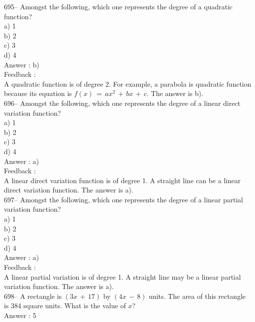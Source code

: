 \documentclass[letterpaper, 12pt]{article}
\begin{document}
695-- Amongst the following, which one represents the degree of a quadratic function?\\
a) 1\\
b) 2\\
c) 3\\
d) 4\\

Answer : b)\\

Feedback : \\
A quadratic function is of degree 2. For example, a parabola is quadratic function because its equation is 
$f(x)\,=\,ax^2 \,+\, bx \,+\, c$.  The answer is b).\\

696-- Amongst the following, which one represents the degree of a linear direct variation function?\\
a) 1\\
b) 2\\
c) 3\\
d) 4\\

Answer : a)\\

Feedback : \\
A linear direct variation function is of degree 1. A straight line can be a linear direct variation function. The answer is
a).\\

697-- Amongst the following, which one represents the degree of a linear partial variation function?\\
a) 1\\
b) 2\\
c) 3\\
d) 4\\

Answer : a)\\

Feedback : \\
A linear partial variation is of degree 1. A straight line may be a linear partial variation function. The answer is a).\\

698-- A rectangle is $(3x\,+\,17)$ by $(4x\,-\,8)$ units. The area of this rectangle is 384 square units. What is the value of $x$?\\

Answer : 5\\
\end{document}
